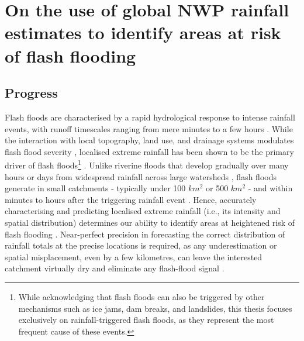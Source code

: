\section{On the use of global NWP rainfall estimates to identify areas at risk of flash flooding}

\subsection{Progress}

Flash floods are characterised by a rapid hydrological response to intense rainfall events, with runoff timescales ranging from mere minutes to a few hours \citep{Davis_2001}. While the interaction with local topography, land use, and drainage systems modulates flash flood severity \citep{Marchi_2010, Villacca_2025}, localised extreme rainfall has been shown to be the primary driver of flash floods\footnote{While acknowledging that flash floods can also be triggered by other mechanisms such as ice jams, dam breaks, and landslides, this thesis focuses exclusively on rainfall-triggered flash floods, as they represent the most frequent cause of these events.} \citep{Schumacher_2017, Borga_2014, Archer_2018, Meyer_2022}. Unlike riverine floods that develop gradually over many hours or days from widespread rainfall across large watersheds \citep{Wohl_2022}, flash floods generate in small catchments - typically under 100 $km^2$ or 500 $km^2$ - and within minutes to hours after the triggering rainfall event \citep{Braud_2014, Bloschl_2015}. Hence, accurately characterising and predicting localised extreme rainfall (i.e., its intensity and spatial distribution) determines our ability to identify areas at heightened risk of flash flooding . Near-perfect precision in forecasting the correct distribution of rainfall totals at the precise locations is required, as any underestimation or spatial misplacement, even by a few kilometres, can leave the interested catchment virtually dry and eliminate any flash-flood signal \citep{Nicotina_2008, Douinot_2016, Clark_2016, Wang_2022}.

